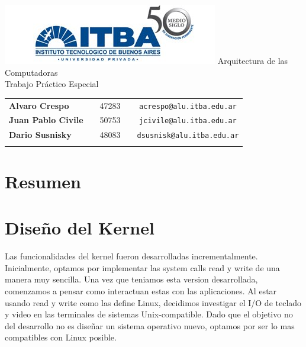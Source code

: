 \documentclass[a4paper,10pt]{article}
\begin{document}
\begin{titlepage}
        \thispagestyle{empty}
        \begin{center}
                \includegraphics{./images/itba.jpg}
                \vfill
                \Huge{Arquitectura de las Computadoras}\\
                \vspace{1cm}
                \huge{Trabajo Práctico Especial}\\
        \end{center}
        \vspace{2cm}
        \large{
                \begin{tabular}{lcrc}
                        \textbf{Alvaro Crespo} & & 47283 & \ \ \texttt{acrespo@alu.itba.edu.ar}\\
                        \textbf{Juan Pablo Civile} & & 50753 & \ \ \texttt{jcivile@alu.itba.edu.ar}\\
                        \textbf{Dario Susnisky} & & 48083 & \ \ \texttt{dsusnisk@alu.itba.edu.ar}\\
                        \\ 
                \end{tabular}
        }
        \vfill
\end{titlepage}

\setcounter{page}{1}

\tableofcontents
\newpage

\section{Resumen}

\section{Diseño del Kernel}
    Las funcionalidades del kernel fueron desarrolladas incrementalmente. Inicialmente, optamos por implementar las system calls read y write de una manera muy sencilla.
    Una vez que teniamos esta version desarrollada, comenzamos a pensar como interactuan estas con las aplicaciones. 
    Al estar usando read y write como las define Linux, decidimos investigar el I/O de teclado y video en las terminales de sistemas Unix-compatible.
    Dado que el objetivo no del desarrollo no es diseñar un sistema operativo nuevo, optamos por ser lo mas compatibles con Linux posible.
\end{document}
